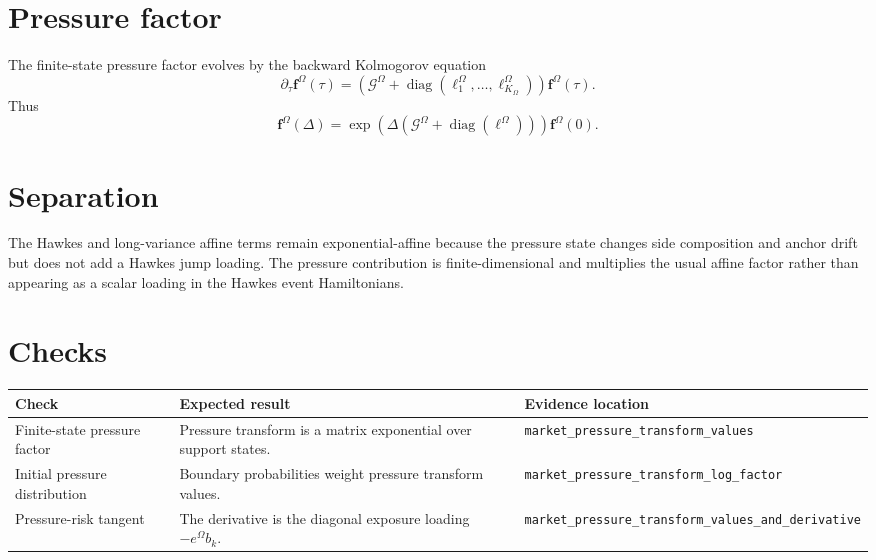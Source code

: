 \documentclass[11pt]{article}
\begin{document}
\section{Pressure factor}

The finite-state pressure factor evolves by the backward Kolmogorov equation
\[
    \partial_\tau\mathbf f^\Omega(\tau)
    =
    \left(\mathcal G^\Omega+\operatorname{diag}(\ell_1^\Omega,\ldots,\ell_{K_\Omega}^\Omega)\right)
    \mathbf f^\Omega(\tau).
\]
Thus
\[
    \mathbf f^\Omega(\Delta)
    =
    \exp\!\left(
        \Delta\left(\mathcal G^\Omega+\operatorname{diag}(\boldsymbol\ell^\Omega)\right)
    \right)\mathbf f^\Omega(0).
\]

\section{Separation}

The Hawkes and long-variance affine terms remain exponential-affine because the
pressure state changes side composition and anchor drift but does not add a
Hawkes jump loading. The pressure contribution is finite-dimensional and
multiplies the usual affine factor rather than appearing as a scalar loading in
the Hawkes event Hamiltonians.

\section{Checks}

\begin{tabularx}{\textwidth}{XXX}
\toprule
Check & Expected result & Evidence location\\
\midrule
Finite-state pressure factor
& Pressure transform is a matrix exponential over support states.
& \texttt{market\_pressure\_transform\_values}\\
Initial pressure distribution
& Boundary probabilities weight pressure transform values.
& \texttt{market\_pressure\_transform\_log\_factor}\\
Pressure-risk tangent
& The derivative is the diagonal exposure loading \(-e^\Omega b_k\).
& \texttt{market\_pressure\_transform\_values\_and\_derivative}\\
\bottomrule
\end{tabularx}
\end{document}
